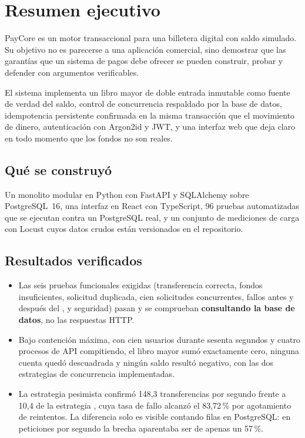 \section{Resumen ejecutivo}

PayCore es un motor transaccional para una billetera digital con saldo
simulado. Su objetivo no es parecerse a una aplicación comercial, sino
demostrar que las garantías que un sistema de pagos debe ofrecer se pueden
construir, probar y defender con argumentos verificables.

El sistema implementa un libro mayor de doble entrada inmutable como fuente de
verdad del saldo, control de concurrencia respaldado por la base de datos,
idempotencia persistente confirmada en la misma transacción que el movimiento
de dinero, autenticación con Argon2id y JWT, y una interfaz web que deja claro
en todo momento que los fondos no son reales.

\subsection*{Qué se construyó}

Un monolito modular en Python con FastAPI y SQLAlchemy sobre PostgreSQL~16,
una interfaz en React con TypeScript, 96 pruebas automatizadas que se ejecutan
contra un PostgreSQL real, y un conjunto de mediciones de carga con Locust
cuyos datos crudos están versionados en el repositorio.

\subsection*{Resultados verificados}

\begin{itemize}[leftmargin=1.2em]
  \item Las seis pruebas funcionales exigidas (transferencia correcta, fondos
    insuficientes, solicitud duplicada, cien solicitudes concurrentes, fallos
    antes y después del , y seguridad) pasan y se comprueban
    \textbf{consultando la base de datos}, no las respuestas HTTP.
  \item Bajo contención máxima, con cien usuarios durante sesenta segundos y
    cuatro procesos de API compitiendo, el libro mayor sumó exactamente cero,
    ninguna cuenta quedó descuadrada y ningún saldo resultó negativo, con las
    dos estrategias de concurrencia implementadas.
  \item La estrategia pesimista confirmó 148,3 transferencias por segundo
    frente a 10,4 de la estrategia , cuya tasa de fallo
    alcanzó el 83,72\,\% por agotamiento de reintentos. La diferencia solo es
    visible contando filas en PostgreSQL: en peticiones por segundo la brecha
    aparentaba ser de apenas un 57\,\%.
\end{itemize}

